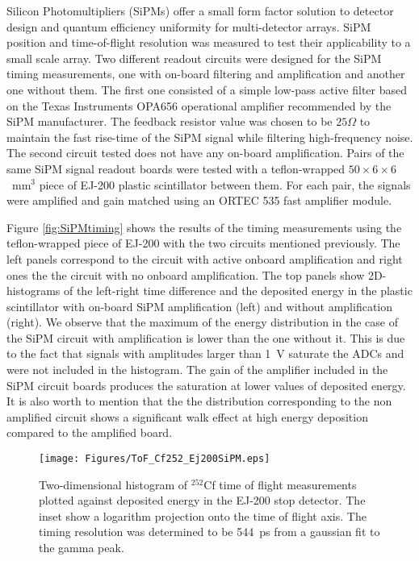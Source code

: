 Silicon Photomultipliers (SiPMs) offer a small form factor solution to detector design and quantum efficiency uniformity for multi-detector arrays. SiPM position and time-of-flight resolution was measured to test their applicability to a small scale array. Two different readout circuits were designed for the SiPM timing measurements, one with on-board filtering and amplification and another one without them.  The first one consisted of a simple low-pass active filter based on the Texas Instruments\textsuperscript{\textregistered} OPA656 operational amplifier recommended by the SiPM manufacturer. The feedback resistor value was chosen to be $25\Omega$ to maintain the fast rise-time of the SiPM signal while filtering high-frequency noise. The second circuit tested does not have any on-board amplification. Pairs of the same SiPM signal readout boards were tested with a teflon-wrapped $50\times6\times6$~mm$^3$ piece of EJ-200 plastic scintillator between them. For each pair, the signals were amplified and gain matched using an ORTEC\textsuperscript{\textregistered} 535 fast amplifier module.

Figure \ref{fig:SiPMtiming} shows the results of the timing measurements using the teflon-wrapped piece of EJ-200 with the two circuits mentioned previously. The left panels correspond to the circuit with active onboard amplification and right ones the the circuit with no onboard amplification. The top panels show 2D-histograms of the left-right time difference and the deposited energy in the plastic scintillator with on-board SiPM amplification (left) and without amplification (right). We observe that the maximum of the energy distribution in the case of the SiPM circuit with amplification is lower than the one without it. This is due to the fact that signals with amplitudes larger than 1~V saturate the ADCs and were not included in the histogram. The gain of the amplifier included in the SiPM circuit boards produces the saturation at lower values of deposited energy. It is also worth to mention that the the distribution corresponding to the non amplified circuit shows a significant walk effect at high energy deposition compared to the amplified board.
\begin{figure}[t]
  \texttt{[image: Figures/ToF\_Cf252\_Ej200SiPM.eps]}
  \caption{Two-dimensional histogram of $^{252}$Cf time of flight measurements plotted against deposited energy in the EJ-200 stop detector. The inset show a logarithm projection onto the time of flight axis. The timing resolution was determined to be 544~ps from a gaussian fit to the gamma peak.}
  \label{fig:ToF_SiPM}
\end{figure}

